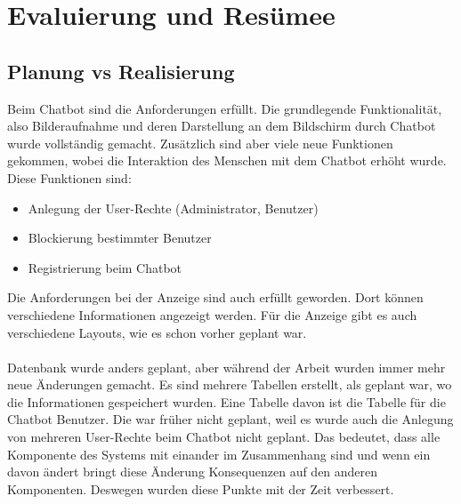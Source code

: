 \section{Evaluierung und Resümee}
\subsection{Planung vs Realisierung}
Beim Chatbot sind die Anforderungen erfüllt. Die grundlegende Funktionalität, also Bilderaufnahme und deren Darstellung an dem Bildschirm durch Chatbot wurde vollständig gemacht. Zusätzlich sind aber viele neue Funktionen gekommen, wobei die Interaktion des Menschen mit dem Chatbot erhöht wurde. \\
Diese Funktionen sind:
\begin{itemize}
	\item Anlegung der User-Rechte (Administrator, Benutzer)
\end{itemize}
\begin{itemize}
	\item Blockierung bestimmter Benutzer
\end{itemize}
\begin{itemize}
	\item Registrierung beim Chatbot
\end{itemize}
Die Anforderungen bei der Anzeige sind auch erfüllt geworden. Dort können verschiedene Informationen angezeigt werden. Für die Anzeige gibt es auch verschiedene Layouts, wie es schon vorher geplant war. \\
\\
Datenbank wurde anders geplant, aber während der Arbeit wurden immer mehr neue Änderungen gemacht. Es sind mehrere Tabellen erstellt, als geplant war, wo die Informationen gespeichert wurden. Eine Tabelle davon ist die Tabelle für die Chatbot Benutzer. Die war früher nicht geplant, weil es wurde auch die Anlegung von mehreren User-Rechte beim Chatbot nicht geplant. Das bedeutet, dass alle Komponente des Systems mit einander im Zusammenhang sind und wenn ein davon ändert bringt diese Änderung Konsequenzen auf den anderen Komponenten. Deswegen wurden diese Punkte mit der Zeit verbessert.  

